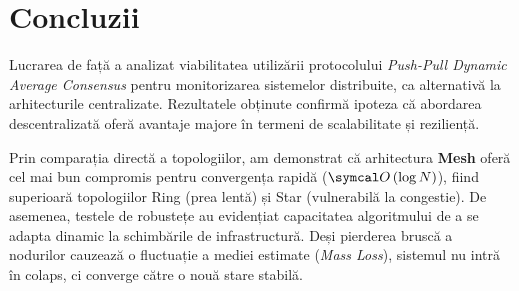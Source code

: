\section{Concluzii}
\label{sec:conclusion}

Lucrarea de față a analizat viabilitatea utilizării protocolului \textit{Push-Pull Dynamic Average Consensus} pentru monitorizarea sistemelor distribuite, ca alternativă la arhitecturile centralizate. Rezultatele obținute confirmă ipoteza că abordarea descentralizată oferă avantaje majore în termeni de scalabilitate și reziliență.

Prin comparația directă a topologiilor, am demonstrat că arhitectura \textbf{Mesh} oferă cel mai bun compromis pentru convergența rapidă ($\bigO{\log N}$), fiind superioară topologiilor Ring (prea lentă) și Star (vulnerabilă la congestie). De asemenea, testele de robustețe au evidențiat capacitatea algoritmului de a se adapta dinamic la schimbările de infrastructură. Deși pierderea bruscă a nodurilor cauzează o fluctuație a mediei estimate (\textit{Mass Loss}), sistemul nu intră în colaps, ci converge către o nouă stare stabilă.